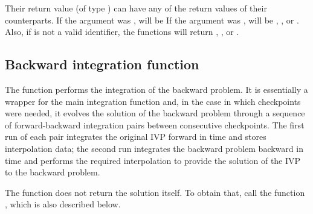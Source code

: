 Their return value  (of type ) can have any of the return values 
of their counterparts.
If the  argument was ,  will be
If the  argument was , 
 will be , , or . 
Also, if  is not a valid identifier, the functions will return 
, , or .


\subsection{Backward integration function}
\label{sss:cvsolveb}

The function  performs the integration of the backward problem.
It is essentially a wrapper for the {\cvodes} main integration function 
 and, in the case in which checkpoints were needed, it evolves 
the solution of the backward problem through a sequence of forward-backward 
integration pairs between consecutive checkpoints. 
The first run of each pair integrates the original IVP forward in time and
stores interpolation data; the second run integrates the backward problem 
backward in time and performs the required interpolation to provide
the solution of the IVP to the backward problem.

The function  does not return the solution  itself.
To obtain that, call the function , which is also
described below.

